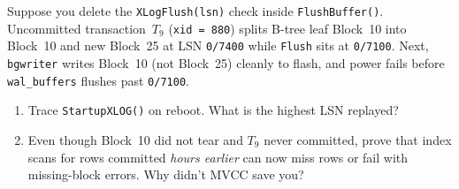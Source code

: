 \begin{exercise}
\label{ch04:ex-break-wal-rule}
Suppose you delete the \texttt{XLogFlush(lsn)} check inside \texttt{FlushBuffer()}. Uncommitted transaction~$T_9$ (\texttt{xid = 880}) splits B-tree leaf Block~10 into Block~10 and new Block~25 at LSN \texttt{0/7400} while \texttt{Flush} sits at \texttt{0/7100}. Next, \texttt{bgwriter} writes Block~10 (not Block~25) cleanly to flash, and power fails before \texttt{wal\_buffers} flushes past \texttt{0/7100}.
\begin{enumerate}
  \item Trace \texttt{StartupXLOG()} on reboot. What is the highest LSN replayed?
  \item Even though Block~10 did not tear and $T_9$ never committed, prove that index scans for rows committed \emph{hours earlier} can now miss rows or fail with missing-block errors. Why didn't MVCC save you?
\end{enumerate}
\end{exercise}

